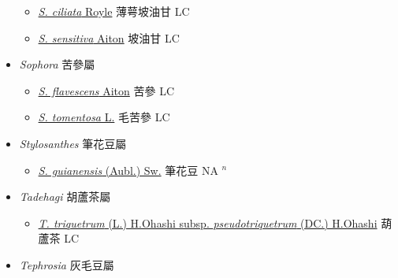 \begin{itemize}
  \begin{itemize}
        \item[] \href{http://www.theplantlist.org/tpl1.1/search?q=Smithia+ciliata}{\textit{S. ciliata} Royle}   薄萼坡油甘 LC
        \item[] \href{http://www.theplantlist.org/tpl1.1/search?q=Smithia+sensitiva}{\textit{S. sensitiva} Aiton}   坡油甘 LC
  \end{itemize}
 \item[] \textit{Sophora} 苦參屬
                    
  \begin{itemize}
        \item[] \href{http://www.theplantlist.org/tpl1.1/search?q=Sophora+flavescens}{\textit{S. flavescens} Aiton}   苦參 LC
        \item[] \href{http://www.theplantlist.org/tpl1.1/search?q=Sophora+tomentosa}{\textit{S. tomentosa} L.}   毛苦參 LC
  \end{itemize}
 \item[] \textit{Stylosanthes} 筆花豆屬
                    
  \begin{itemize}
        \item[] \href{http://www.theplantlist.org/tpl1.1/search?q=Stylosanthes+guianensis}{\textit{S. guianensis} (Aubl.) Sw.}   筆花豆 NA $^n$
  \end{itemize}
 \item[] \textit{Tadehagi} 胡蘆茶屬
                    
  \begin{itemize}
        \item[] \href{http://www.theplantlist.org/tpl1.1/search?q=Tadehagi+triquetrum+subsp.+pseudotriquetrum}{\textit{T. triquetrum} (L.) H.Ohashi subsp. \textit{pseudotriquetrum} (DC.) H.Ohashi}   葫蘆茶 LC
  \end{itemize}
 \item[] \textit{Tephrosia} 灰毛豆屬
                    

\end{itemize}
